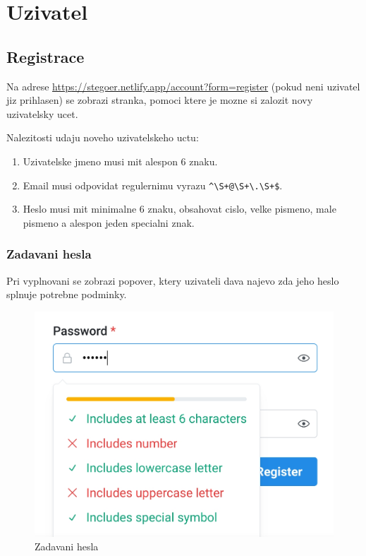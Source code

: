 
\section{Uzivatel}\label{sec:uzivatel}

\subsection{Registrace}\label{subsec:registrace}
Na adrese \url{https://stegoer.netlify.app/account?form=register} (pokud neni
uzivatel jiz prihlasen) se zobrazi stranka, pomoci ktere je mozne si zalozit
novy uzivatelsky ucet.

Nalezitosti udaju noveho uzivatelskeho uctu:

\begin{enumerate}
    \item Uzivatelske jmeno musi mit alespon 6 znaku.
    \item Email musi odpovidat regulernimu vyrazu \verb/^\S+@\S+\.\S+$/.
    \item Heslo musi mit minimalne 6 znaku, obsahovat cislo, velke pismeno, male
    pismeno a alespon jeden specialni znak.
\end{enumerate}

\subsubsection{Zadavani hesla}\label{subsubsec:zadavani-hesla}

Pri vyplnovani se zobrazi popover\cite{enwiki:popover}, ktery uzivateli dava
najevo zda jeho heslo splnuje potrebne podminky.

\begin{figure}
    \centering
    \includegraphics[scale=0.3]{assets/images/password-popover}
    \caption{Zadavani hesla}\label{fig:zadavani-hesla}
\end{figure}

